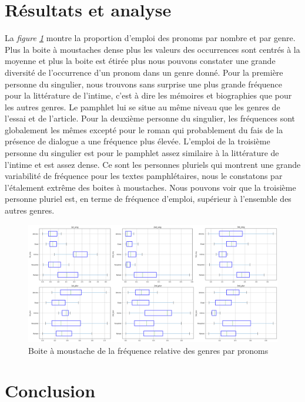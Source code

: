 \section{Résultats et analyse}

La \textit{figure \ref{sortieboitemoustachepronoms}} montre la proportion d'emploi des pronoms par nombre et par genre. Plus la boite à moustaches dense plus les valeurs des occurrences sont centrés à la moyenne et plus la boite est étirée plus nous pouvons constater une grande diversité de l'occurrence d'un pronom dans un genre donné. Pour la première personne du singulier, nous trouvons sans surprise une plus grande fréquence pour la littérature de l'intime, c'est à dire les mémoires et biographies que pour les autres genres. Le pamphlet lui se situe au même niveau que les genres de l'essai et de l'article. Pour la deuxième personne du singulier, les fréquences sont globalement les mêmes excepté pour le roman qui probablement du fais de la présence de dialogue a une fréquence plus élevée. L'emploi de la troisième personne du singulier est pour le pamphlet assez similaire à la littérature de l'intime et est assez dense. Ce sont les personnes pluriels qui montrent une grande variabilité de fréquence pour les textes pamphlétaires, nous le constatons par l'étalement extrême des boites à moustaches. Nous pouvons voir que la troisième personne pluriel est, en terme de fréquence d'emploi, supérieur à l'ensemble des autres genres. 

\begin{figure}[H]
\includegraphics[width=1\textwidth]{img/boxplot_pronoms.png}
\caption{Boite à moustache de la fréquence relative des genres par pronoms}
\label{sortieboitemoustachepronoms}
\end{figure}

\section{Conclusion}


